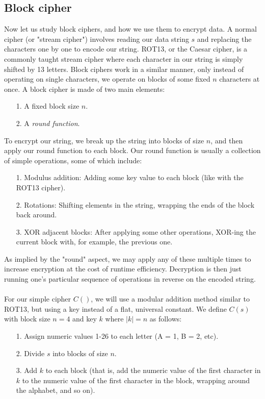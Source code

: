 \documentclass[11pt]{article}
\begin{document}
\subsection{Block cipher}\label{block-cipher-subsect}
Now let us study block ciphers, and how we use them to encrypt data. A normal cipher (or "stream cipher") involves 
reading our data string $s$ and replacing the characters one by one to encode our string. 
ROT13, or the Caesar cipher, is a commonly taught stream cipher where each character in our string is 
simply shifted by 13 letters. Block ciphers work in a similar manner, only instead of operating on single 
characters, we operate on blocks of some fixed $n$ characters at once. 
A block cipher is made of two main elements:
\begin{itemize}
	\item[1.] A fixed block size $n$.
	\item[2.] A \emph{round function}.
\end{itemize}
To encrypt our string, we break up the string into blocks of size $n$, and then apply our round function to each block. 
Our round function is usually a collection of simple operations, some of which include:
\begin{itemize}
	\item[1.] Modulus addition: Adding some key value to each block (like with the ROT13 cipher).
	\item[2.] Rotations: Shifting elements in the string, wrapping the ends of the block back around.
	\item[3.] XOR adjacent blocks: After applying some other operations, XOR-ing the current block with, 
for example, the previous one. 
\end{itemize}
As implied by the "round" aspect, we may apply any of these multiple times to increase encryption at the cost 
of runtime efficiency. Decryption is then just running one's particular sequence of operations in reverse on the 
encoded string.\\\\
For our simple cipher $C()$, we will use a modular addition method similar to ROT13, but using a key instead 
of a flat, universal constant. We define $C(s)$ with block size $n=4$ and key $k$ where $|k|=n$ as follows: 
\begin{itemize}
	\item[1.] Assign numeric values 1-26 to each letter (A = 1, B = 2, etc).
	\item[2.] Divide $s$ into blocks of size $n$.
	\item[3.] Add $k$ to each block (that is, add the numeric value of the first character in $k$ to the 
numeric value of the first character in the block, wrapping around the alphabet, and so on). 
\end{itemize}
\end{document}
